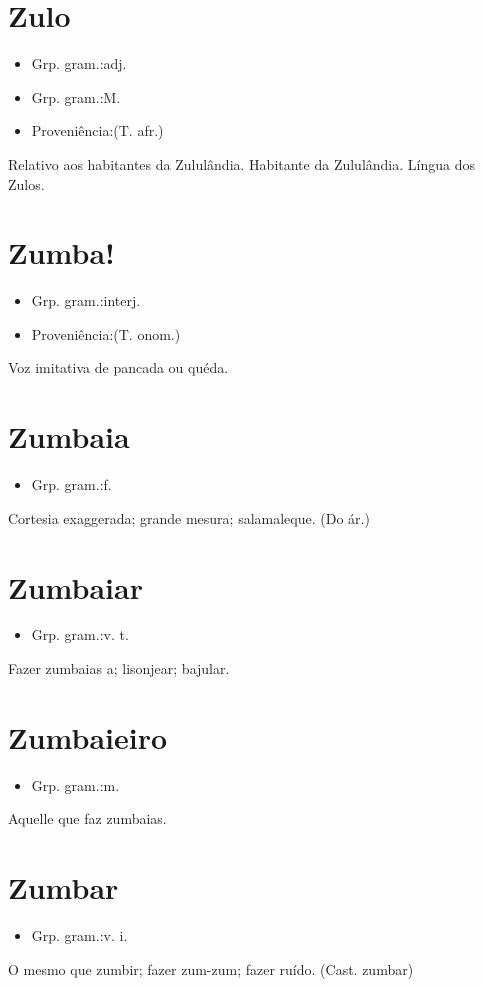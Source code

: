 \section{Zulo}
\begin{itemize}
\item {Grp. gram.:adj.}
\end{itemize}
\begin{itemize}
\item {Grp. gram.:M.}
\end{itemize}
\begin{itemize}
\item {Proveniência:(T. afr.)}
\end{itemize}
Relativo aos habitantes da Zululândia.
Habitante da Zululândia.
Língua dos Zulos.
\section{Zumba!}
\begin{itemize}
\item {Grp. gram.:interj.}
\end{itemize}
\begin{itemize}
\item {Proveniência:(T. onom.)}
\end{itemize}
Voz imitativa de pancada ou quéda.
\section{Zumbaia}
\begin{itemize}
\item {Grp. gram.:f.}
\end{itemize}
Cortesia exaggerada; grande mesura; salamaleque.
(Do ár.)
\section{Zumbaiar}
\begin{itemize}
\item {Grp. gram.:v. t.}
\end{itemize}
Fazer zumbaias a; lisonjear; bajular.
\section{Zumbaieiro}
\begin{itemize}
\item {Grp. gram.:m.}
\end{itemize}
Aquelle que faz zumbaias.
\section{Zumbar}
\begin{itemize}
\item {Grp. gram.:v. i.}
\end{itemize}
O mesmo que \textunderscore zumbir\textunderscore ; fazer zum-zum; fazer ruído.
(Cast. \textunderscore zumbar\textunderscore )
